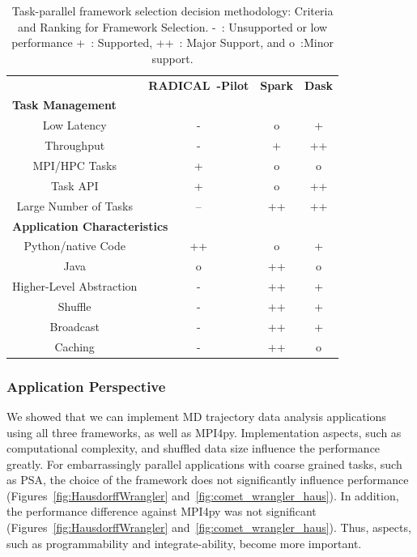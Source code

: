 \begin{table}[t]
    \centering
    \begin{tabular}{@{}cccc@{}}
        \toprule
        &\textbf{RADICAL~-Pilot}     &\textbf{Spark} &\textbf{Dask}\\
        \multicolumn{4}{l}{\textbf{Task Management}} \\
        \midrule
        Low Latency   &- &o &+\\
        Throughput    &- &+ &++\\
        MPI/HPC Tasks &+ &o &o\\
        Task API   &+ &o &++\\
        Large Number of Tasks   &-- &++ &++\\\hline
        \multicolumn{4}{l}{\textbf{Application Characteristics}}\\\midrule
        Python/native Code &++ &o &+\\
        Java               &o &++ &o\\
        Higher-Level Abstraction &- &++ &+\\
        Shuffle                  &- &++ &+\\
        Broadcast                &- &++ &+\\
        Caching                  &- &++ &o\\
        \bottomrule
    \end{tabular}
    \caption{Task-parallel framework selection decision methodology: Criteria and Ranking for Framework Selection. -~: Unsupported or low performance
        +~: Supported, ++~: Major Support, and o~:Minor support.\label{tab:framework}}
\end{table}

\subsubsection*{Application Perspective}
We showed that we can implement MD trajectory data analysis applications using all three frameworks, as well as MPI4py.
Implementation aspects, such as computational complexity, and shuffled data size influence the performance greatly.
For embarrassingly parallel applications with coarse grained tasks, such as PSA, the choice of the framework does not significantly influence performance (Figures~\ref{fig:HausdorffWrangler} and~\ref{fig:comet_wrangler_haus}).
In addition, the performance difference against MPI4py was not significant (Figures~\ref{fig:HausdorffWrangler} and~\ref{fig:comet_wrangler_haus}).
Thus, aspects, such as programmability and integrate-ability, become more important.

